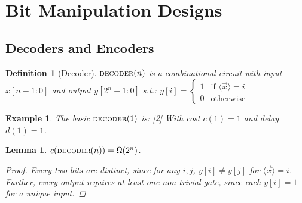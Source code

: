 \documentclass[12pt]{article}
\newcommand{\scr}[1]{{\scriptstyle\textup{#1}}}
\newcommand{\repr}[1]{\langle{#1}\rangle}
\newtheorem{definition}[theorem]{Definition}
\newtheorem{lemma}[theorem]{Lemma}
\newtheorem{example}[theorem]{Example}
\begin{document}
\pagebreak

\section{Bit Manipulation Designs}

\subsection{Decoders and Encoders}

\begin{definition}[Decoder]
  $\scr{DECODER}(n)$ is a combinational circuit with input $x[n-1:0]$ and output $y[2^n-1:0]$ s.t.: $y[i]=\begin{cases}
    1&\text{if }\repr{\vec{x}}=i\\
    0&\text{otherwise}
  \end{cases}$
\end{definition}

\begin{example}
  The basic $\scr{DECODER}(1)$ is:
  [2]
  \noindent With cost $c(1)=1$ and delay $d(1)=1$.
\end{example}

\begin{lemma}
  \label{decoder_cost}
  $c(\scr{DECODER}(n))=\Omega(2^n)$.
  \begin{proof}
    Every two bits are distinct, since for any $i,j$, $y[i]\neq y[j]$ for $\repr{\vec{x}}=i$. Further, every output requires at least one non-trivial gate, since each $y[i]=1$ for a unique input.
  \end{proof}
\end{lemma}
\end{document}
